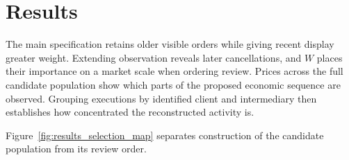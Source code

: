 \documentclass[11pt]{article}
\begin{document}


\section{Results}
\label{sec:results}

The main specification retains older visible orders while giving recent display greater weight. Extending observation reveals later cancellations, and $W$ places their importance on a market scale when ordering review. Prices across the full candidate population show which parts of the proposed economic sequence are observed. Grouping executions by identified client and intermediary then establishes how concentrated the reconstructed activity is.

Figure~\ref{fig:results_selection_map} separates construction of the candidate population from its review order.
\end{document}
